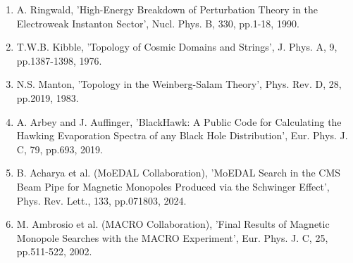 \documentclass[12pt,a4paper]{article}
\begin{document}
\begin{enumerate}
\item A. Ringwald, 'High-Energy Breakdown of Perturbation Theory in the Electroweak Instanton Sector', Nucl. Phys. B, 330, pp.1-18, 1990.
\item T.W.B. Kibble, 'Topology of Cosmic Domains and Strings', J. Phys. A, 9, pp.1387-1398, 1976.
\item N.S. Manton, 'Topology in the Weinberg-Salam Theory', Phys. Rev. D, 28, pp.2019, 1983.
\item A. Arbey and J. Auffinger, 'BlackHawk: A Public Code for Calculating the Hawking Evaporation Spectra of any Black Hole Distribution', Eur. Phys. J. C, 79, pp.693, 2019.
\item B. Acharya et al. (MoEDAL Collaboration), 'MoEDAL Search in the CMS Beam Pipe for Magnetic Monopoles Produced via the Schwinger Effect', Phys. Rev. Lett., 133, pp.071803, 2024.
\item M. Ambrosio et al. (MACRO Collaboration), 'Final Results of Magnetic Monopole Searches with the MACRO Experiment', Eur. Phys. J. C, 25, pp.511-522, 2002.
\end{enumerate}
\normalsize
\end{document}
